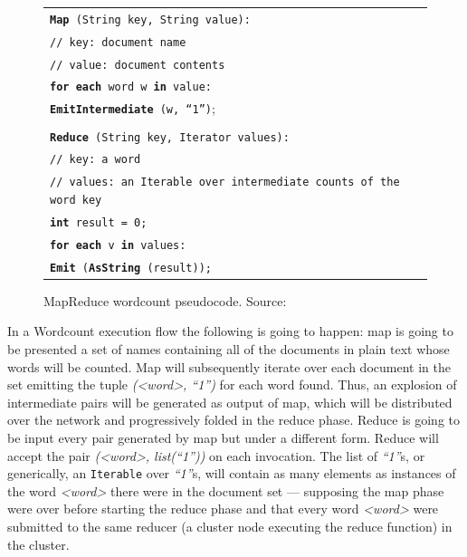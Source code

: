 \begin{figure}[tbp]
 \begin{center}
  \begin{tabular}{|l|}
   \hline
   \texttt{{\bf Map} (String key, String value):} \\
   \texttt{// key: document name} \\
   \texttt{// value: document contents} \\
   \texttt{{\bf for each} word w {\bf in} value:} \\
   \texttt{{\bf EmitIntermediate} (w, ``1'')};\\ \\

   \texttt{{\bf Reduce} (String key, Iterator values):} \\
   \texttt{// key: a word} \\
   \texttt{// values: an Iterable over intermediate counts of the word key} \\
   \texttt{{\bf int} result = 0;} \\
   \texttt{{\bf for each} v {\bf in} values:} \\
   \texttt{{\bf Emit} ({\bf AsString} (result));} \\
   \hline
  \end{tabular}
  \caption{MapReduce wordcount pseudocode. Source: \cite{googlemapreduce}}
  \label{fig:wordcount}
 \end{center}
\end{figure}

In a Wordcount execution flow the following is going to happen: map is going to be presented a set of names containing all of the documents in plain text whose words will be counted. Map will subsequently iterate over each document in the set emitting the tuple \emph{(<word>, ``1'')} for each word found. Thus, an explosion of intermediate pairs will be generated as output of map, which will be distributed over the network and progressively folded in the reduce phase. Reduce is going to be input every pair generated by map but under a different form. Reduce will accept the pair \emph{(<word>, list(``1''))} on each invocation. The list of \emph{``1''}s, or generically, an \texttt{Iterable} over \emph{``1''}s, will contain as many elements as instances of the word \emph{<word>} there were in the document set --- supposing the map phase were over before starting the reduce phase and that every word \emph{<word>} were submitted to the same reducer (a cluster node executing the reduce function) in the cluster.

